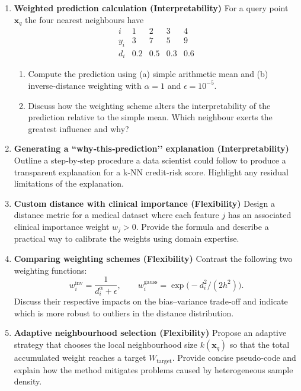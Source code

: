 \documentclass[12pt, a4paper]{article}
\begin{document}
\begin{enumerate}
    \item \textbf{Weighted prediction calculation (Interpretability)}  
    For a query point \(\mathbf{x}_q\) the four nearest neighbours have
    \[
    \begin{array}{c|cccc}
    i & 1 & 2 & 3 & 4\\\hline
    y_i & 3 & 7 & 5 & 9\\
    d_i & 0.2 & 0.5 & 0.3 & 0.6
    \end{array}
    \]
    \begin{enumerate}
        \item Compute the prediction using (a) simple arithmetic mean and (b) inverse‑distance weighting with \(\alpha=1\) and \(\epsilon=10^{-5}\).
        \item Discuss how the weighting scheme alters the interpretability of the prediction relative to the simple mean. Which neighbour exerts the greatest influence and why?
    \end{enumerate}
    
    \item \textbf{Generating a “why‑this‑prediction’’ explanation (Interpretability)}  
    Outline a step‑by‑step procedure a data scientist could follow to produce a transparent explanation for a k‑NN credit‑risk score. Highlight any residual limitations of the explanation.

    \item \textbf{Custom distance with clinical importance (Flexibility)}  
    Design a distance metric for a medical dataset where each feature \(j\) has an associated clinical importance weight \(w_j>0\). Provide the formula and describe a practical way to calibrate the weights using domain expertise.

    \item \textbf{Comparing weighting schemes (Flexibility)}  
    Contrast the following two weighting functions:
    \[
    w_i^{\text{inv}} = \frac{1}{d_i^{\alpha}+\epsilon}, \qquad
    w_i^{\text{gauss}} = \exp\!\bigl(-d_i^{2}/(2h^{2})\bigr).
    \]
    Discuss their respective impacts on the bias–variance trade‑off and indicate which is more robust to outliers in the distance distribution.

    \item \textbf{Adaptive neighbourhood selection (Flexibility)}  
    Propose an adaptive strategy that chooses the local neighbourhood size \(k(\mathbf{x}_q)\) so that the total accumulated weight reaches a target \(W_{\text{target}}\). Provide concise pseudo‑code and explain how the method mitigates problems caused by heterogeneous sample density.


\end{enumerate}
\end{document}
